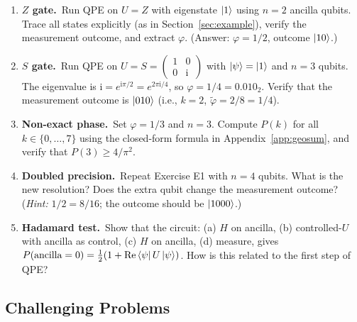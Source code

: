 \documentclass[12pt,a4paper]{article}
\newcommand{\QPE}{\textsc{QPE}}
\newcommand{\ii}{\mathrm{i}}
\begin{document}
\begin{enumerate}[label=\textbf{E\arabic*.}, leftmargin=*]
  \item \textbf{$Z$ gate.}\ Run \QPE{} on $U=Z$ with eigenstate $\Ket{1}$
        using $n=2$ ancilla qubits.  Trace all states explicitly (as in
        Section~\ref{sec:example}), verify the measurement outcome, and
        extract $\varphi$.  (Answer: $\varphi = 1/2$, outcome $\Ket{10}$.)

  \item \textbf{$S$ gate.}\ Run \QPE{} on $U=S=\begin{pmatrix}1&0\\0&\ii\end{pmatrix}$
        with $\Ket{\psi}=\Ket{1}$ and $n=3$ qubits.  The eigenvalue is
        $\ii = e^{\ii\pi/2} = e^{2\pi\ii/4}$, so $\varphi=1/4 = 0.010_2$.
        Verify that the measurement outcome is $\Ket{010}$ (i.e., $k=2$,
        $\tilde\varphi = 2/8 = 1/4$).

  \item \textbf{Non-exact phase.}\ Set $\varphi = 1/3$ and $n=3$.  Compute
        $P(k)$ for all $k\in\{0,\ldots,7\}$ using the closed-form formula
        in Appendix~\ref{app:geosum}, and verify that $P(3) \geq 4/\pi^2$.

  \item \textbf{Doubled precision.}\ Repeat Exercise E1 with $n=4$ qubits.
        What is the new resolution?  Does the extra qubit change the
        measurement outcome?  (\emph{Hint:} $1/2 = 8/16$; the outcome should
        be $\Ket{1000}$.)

  \item \textbf{Hadamard test.}\ Show that the circuit:
        (a) $H$ on ancilla, (b) controlled-$U$ with ancilla as control,
        (c) $H$ on ancilla, (d) measure,
        gives $P(\text{ancilla}=0) = \tfrac{1}{2}(1+\operatorname{Re}\Bra{\psi}U\Ket{\psi})$.
        How is this related to the first step of \QPE{}?
\end{enumerate}

\subsection{Challenging Problems}
\end{document}
